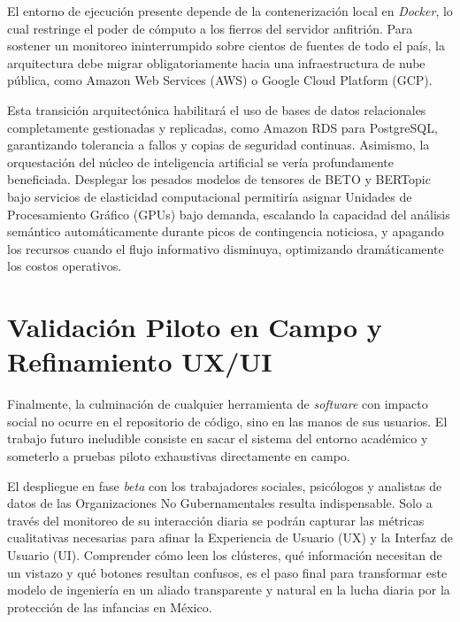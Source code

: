 El entorno de ejecución presente depende de la contenerización local en \textit{Docker}, lo cual restringe el poder de cómputo a los fierros del servidor anfitrión. Para sostener un monitoreo ininterrumpido sobre cientos de fuentes de todo el país, la arquitectura debe migrar obligatoriamente hacia una infraestructura de nube pública, como Amazon Web Services (AWS) o Google Cloud Platform (GCP).

Esta transición arquitectónica habilitará el uso de bases de datos relacionales completamente gestionadas y replicadas, como Amazon RDS para PostgreSQL, garantizando tolerancia a fallos y copias de seguridad continuas. Asimismo, la orquestación del núcleo de inteligencia artificial se vería profundamente beneficiada. Desplegar los pesados modelos de tensores de BETO y BERTopic bajo servicios de elasticidad computacional permitiría asignar Unidades de Procesamiento Gráfico (GPUs) bajo demanda, escalando la capacidad del análisis semántico automáticamente durante picos de contingencia noticiosa, y apagando los recursos cuando el flujo informativo disminuya, optimizando dramáticamente los costos operativos.

\section{Validación Piloto en Campo y Refinamiento UX/UI}
\label{sec:tf_piloto}

Finalmente, la culminación de cualquier herramienta de \textit{software} con impacto social no ocurre en el repositorio de código, sino en las manos de sus usuarios. El trabajo futuro ineludible consiste en sacar el sistema del entorno académico y someterlo a pruebas piloto exhaustivas directamente en campo. 

El despliegue en fase \textit{beta} con los trabajadores sociales, psicólogos y analistas de datos de las Organizaciones No Gubernamentales resulta indispensable. Solo a través del monitoreo de su interacción diaria se podrán capturar las métricas cualitativas necesarias para afinar la Experiencia de Usuario (UX) y la Interfaz de Usuario (UI). Comprender cómo leen los clústeres, qué información necesitan de un vistazo y qué botones resultan confusos, es el paso final para transformar este modelo de ingeniería en un aliado transparente y natural en la lucha diaria por la protección de las infancias en México.
